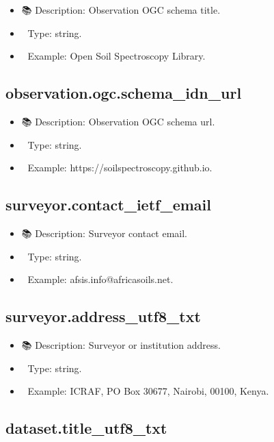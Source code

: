 \documentclass[
  letterpaper,
  DIV=11,
  numbers=noendperiod]{scrreprt}
\providecommand{\tightlist}{%
  \setlength{\itemsep}{0pt}\setlength{\parskip}{0pt}}\usepackage{longtable,booktabs,array}
\begin{document}
\begin{itemize}
\tightlist
\item
  📚 Description: Observation OGC schema title.
\item
  🔢 Type: string.
\item
  📖 Example: Open Soil Spectroscopy Library.
\end{itemize}

\subsection{observation.ogc.schema\_idn\_url}\label{observation.ogc.schema_idn_url}

\begin{itemize}
\tightlist
\item
  📚 Description: Observation OGC schema url.
\item
  🔢 Type: string.
\item
  📖 Example: https://soilspectroscopy.github.io.
\end{itemize}

\subsection{surveyor.contact\_ietf\_email}\label{surveyor.contact_ietf_email}

\begin{itemize}
\tightlist
\item
  📚 Description: Surveyor contact email.
\item
  🔢 Type: string.
\item
  📖 Example: afsis.info@africasoils.net.
\end{itemize}

\subsection{surveyor.address\_utf8\_txt}\label{surveyor.address_utf8_txt}

\begin{itemize}
\tightlist
\item
  📚 Description: Surveyor or institution address.
\item
  🔢 Type: string.
\item
  📖 Example: ICRAF, PO Box 30677, Nairobi, 00100, Kenya.
\end{itemize}

\subsection{dataset.title\_utf8\_txt}\label{dataset.title_utf8_txt}
\end{document}
